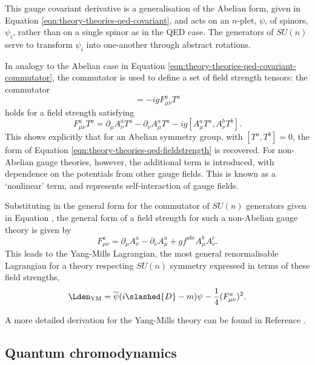 This gauge covariant derivative is a generalisation of the Abelian form, given in
Equation \ref{eqn:theory-theories-qed-covariant}, and acts on an $n$-plet,
$\psi$, of spinors, $\psi_i$, rather than on a single spinor as in the \ac{QED}
case. The generators of $SU(n)$ serve to transform $\psi_i$ into one-another
through abstract rotations.

In analogy to the Abelian case in Equation
\ref{eqn:theory-theories-qed-covariant-commutator}, the commutator is used to
define a set of field strength tensors: the commutator
\begin{equation*}
  [D_\mu, D_\nu] = -igF^a_{\mu\nu}T^a
\end{equation*}
holds for a field strength satisfying
\begin{equation*}
  F^a_{\mu\nu}T^a = \partial_\mu A^a_\nu T^a - \partial_\nu A^a_\mu T^a
                  - ig[A^a_\mu T^a, A^b_\nu T^b].
\end{equation*}
%
This shows explicitly that for an Abelian symmetry group, with $[T^a,T^b]=0$,
the form of Equation \ref{eqn:theory-theories-qed-fieldstrength} is recovered.
For non-Abelian gauge theories, however, the additional term is introduced, with
dependence on the potentials from other gauge fields. This is known as a
`nonlinear' term, and represents self-interaction of gauge fields.

Substituting in the general form for the commutator of $SU(n)$ generators given
in Equation \label{eqn:theory-symmetry-gen-commutator}, the general form of a
field strength for such a non-Abelian gauge theory is given by
\begin{equation}
  F^a_{\mu\nu} = \partial_\mu A^a_\nu - \partial_\nu A^a_\mu
               + gf^{abc}A^b_\mu A^c_\nu.
  \label{eqn:theory-theories-ym-fieldstrength}
\end{equation}
%
This leads to the Yang-Mills Lagrangian, the most general renormalisable
Lagrangian for a theory respecting $SU(n)$ symmetry expressed in terms of these
field strengths,
\begin{equation}
  \Lden_\text{YM} = \overline{\psi}(i\slashed{D} - m)\psi -\frac{1}{4} (F^a_{\mu\nu})^2.
  \label{eqn:theory-theories-ym-lagrangian}
\end{equation}

A more detailed derivation for the Yang-Mills theory can be found in Reference
\cite[pp.486-91]{Peskin1995}.


\subsection{Quantum chromodynamics}

